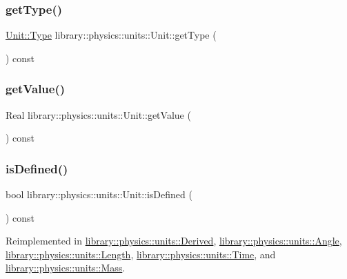 \subsubsection{\texorpdfstring{get\+Type()}{getType()}}
{\footnotesize\ttfamily \hyperlink{classlibrary_1_1physics_1_1units_1_1_unit_a828bc1b6ad6fa5cbef904ea0fede986a}{Unit\+::\+Type} library\+::physics\+::units\+::\+Unit\+::get\+Type (\begin{DoxyParamCaption}{ }\end{DoxyParamCaption}) const}

\mbox{\label{classlibrary_1_1physics_1_1units_1_1_unit_ab6541add236a0c2e5bbfb4b5b35126fb}} 
\subsubsection{\texorpdfstring{get\+Value()}{getValue()}}
{\footnotesize\ttfamily Real library\+::physics\+::units\+::\+Unit\+::get\+Value (\begin{DoxyParamCaption}{ }\end{DoxyParamCaption}) const}

\mbox{\label{classlibrary_1_1physics_1_1units_1_1_unit_a5ce011c1ffa0fce4cf1f5d42ff06ee78}} 
\subsubsection{\texorpdfstring{is\+Defined()}{isDefined()}}
{\footnotesize\ttfamily bool library\+::physics\+::units\+::\+Unit\+::is\+Defined (\begin{DoxyParamCaption}{ }\end{DoxyParamCaption}) const\hspace{0.3cm}{\ttfamily [virtual]}}



Reimplemented in \hyperlink{classlibrary_1_1physics_1_1units_1_1_derived_a26c20c57fc3a7c2fb2ff215d6d4687a2}{library\+::physics\+::units\+::\+Derived}, \hyperlink{classlibrary_1_1physics_1_1units_1_1_angle_a77c7849734ce02b55e070fb88fd87f71}{library\+::physics\+::units\+::\+Angle}, \hyperlink{classlibrary_1_1physics_1_1units_1_1_length_a0249a542e7cc613e6a39275b4e37bd05}{library\+::physics\+::units\+::\+Length}, \hyperlink{classlibrary_1_1physics_1_1units_1_1_time_ab62163386c3253277c5ba71782261cad}{library\+::physics\+::units\+::\+Time}, and \hyperlink{classlibrary_1_1physics_1_1units_1_1_mass_a0efde6eb08d6b79baa84229746776b6a}{library\+::physics\+::units\+::\+Mass}.

